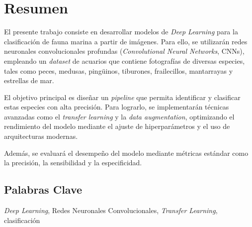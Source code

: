 \section*{Resumen}

\noindent
El presente trabajo consiste en desarrollar modelos de \textit{Deep Learning} para la clasificación de fauna marina a partir de imágenes. Para ello,
se utilizarán redes neuronales convolucionales profundas (\textit{Convolutional Neural Networks}, CNNs), empleando un \textit{dataset} de acuarios
que contiene fotografías de diversas especies, tales como peces, medusas, pingüinos, tiburones, frailecillos, mantarrayas y estrellas de mar. 

\quad

\noindent
El objetivo principal es diseñar un \textit{pipeline} que permita identificar y clasificar estas especies con alta precisión. Para lograrlo, se 
implementarán técnicas avanzadas como el \textit{transfer learning} y la \textit{data augmentation}, optimizando el rendimiento del modelo mediante 
el ajuste de hiperparámetros y el uso de arquitecturas modernas. \cite{chollet2021deep}

\quad

\noindent
Además, se evaluará el desempeño del modelo mediante métricas estándar como la precisión, la sensibilidad y la especificidad.

\subsection*{Palabras Clave}

\noindent
\textit{Deep Learning}, Redes Neuronales Convolucionales, \textit{Transfer Learning}, clasificación
